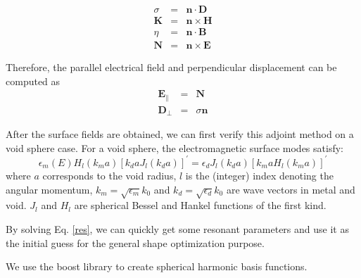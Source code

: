\documentclass[12pt]{article}
\begin{document}
\begin{subequations}
\begin{eqnarray}
\sigma &=& \mathbf{n}\cdot\mathbf{D}\\
\mathbf{K} & =& \mathbf{n}\times\mathbf{H}\\
\eta &=& \mathbf{n}\cdot\mathbf{B}\\
\mathbf{N} & =& \mathbf{n}\times\mathbf{E}
\end{eqnarray}
\end{subequations}

Therefore, the parallel electrical field and perpendicular displacement can be computed as
\begin{subequations}
\begin{eqnarray}
\mathbf{E}_\parallel &=& \mathbf{N}\\
\mathbf{D}_\perp &=& \sigma\mathbf{n}
\end{eqnarray}
\end{subequations}


After the surface fields are obtained, we can first verify this adjoint method on a void sphere case. For a void sphere, the electromagnetic surface modes satisfy:
\begin{equation}
\epsilon_m (E) H_l(k_ma)[k_daJ_l(k_da)]^\prime = \epsilon_d J_l(k_da)[k_maH_l(k_ma)]^\prime\label{res}
\end{equation}
where $a$ corresponds to the void radius, $l$ is the (integer) index denoting the angular momentum, $k_m=\sqrt{\epsilon_m}k_0$ and $k_d = \sqrt{\epsilon_d}k_0$ are wave vectors in metal and void. $J_l$ and $H_l$ are spherical Bessel and Hankel functions of the first kind\cite{ESM1,ESM2}. 

By solving Eq. \eqref{res}, we can quickly get some resonant parameters and use it as the initial guess for the general shape optimization purpose. %

We use the boost library to create spherical harmonic basis functions. 
\end{document}
